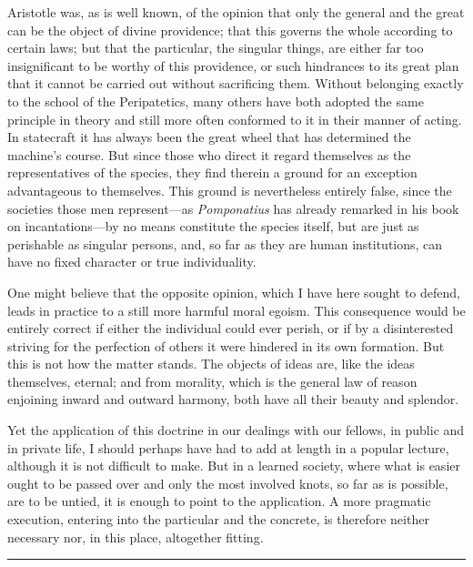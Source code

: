\documentclass[12pt,a4paper]{article}
\begin{document}
Aristotle was, as is well known, of the opinion that only the general and
the great can be the object of divine providence; that this governs the whole
according to certain laws; but that the particular, the singular things, are
either far too insignificant to be worthy of this providence, or such hindrances
to its great plan that it cannot be carried out without sacrificing them. Without
belonging exactly to the school of the Peripatetics, many others have both adopted
the same principle in theory and still more often conformed to it in their manner
of acting. In statecraft it has always been the great wheel that has determined
the machine's course. But since those who direct it regard themselves as the
representatives of the species, they find therein a ground for an exception
advantageous to themselves. This ground is nevertheless entirely false, since the
societies those men represent---as \emph{Pomponatius} has already remarked in his
book on incantations---by no means constitute the species itself, but are just as
perishable as singular persons, and, so far as they are human institutions, can
have no fixed character or true individuality.

One might believe that the opposite opinion, which I have here sought to defend,
leads in practice to a still more harmful moral egoism. This consequence would be
entirely correct if either the individual could ever perish, or if by a
disinterested striving for the perfection of others it were hindered in its own
formation. But this is not how the matter stands. The objects of ideas
are, like the ideas themselves, eternal; and from morality, which is the general
law of reason enjoining inward and outward harmony, both have all their beauty
and splendor.

Yet the application of this doctrine in our dealings with our fellows, in public
and in private life, I should perhaps have had to add at length in a popular
lecture, although it is not difficult to make. But in a learned society, where
what is easier ought to be passed over and only the most involved knots, so far as
is possible, are to be untied, it is enough to point to the application. A more
pragmatic execution, entering into the particular and the concrete, is therefore
neither necessary nor, in this place, altogether fitting.

\begin{center}\rule{0.25\linewidth}{0.4pt}\end{center}
\end{document}
